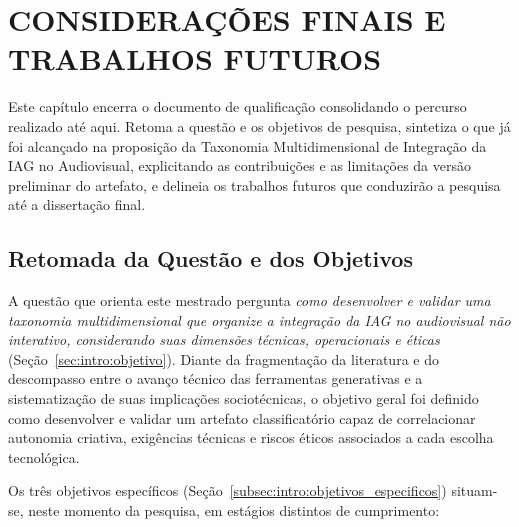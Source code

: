 \chapter{CONSIDERAÇÕES FINAIS E TRABALHOS FUTUROS}
\label{cap:conclusao}

Este capítulo encerra o documento de qualificação consolidando o percurso realizado até aqui. Retoma a questão e os objetivos de pesquisa, sintetiza o que já foi alcançado na proposição da Taxonomia Multidimensional de Integração da IAG no Audiovisual, explicitando as contribuições e as limitações da versão preliminar do artefato, e delineia os trabalhos futuros que conduzirão a pesquisa até a dissertação final.

\section{Retomada da Questão e dos Objetivos}

A questão que orienta este mestrado pergunta \textit{como desenvolver e validar uma taxonomia multidimensional que organize a integração da IAG no audiovisual não interativo, considerando suas dimensões técnicas, operacionais e éticas} (Seção~\ref{sec:intro:objetivo}). Diante da fragmentação da literatura e do descompasso entre o avanço técnico das ferramentas generativas e a sistematização de suas implicações sociotécnicas, o objetivo geral foi definido como desenvolver e validar um artefato classificatório capaz de correlacionar autonomia criativa, exigências técnicas e riscos éticos associados a cada escolha tecnológica.

Os três objetivos específicos (Seção~\ref{subsec:intro:objetivos_especificos}) situam-se, neste momento da pesquisa, em estágios distintos de cumprimento:

